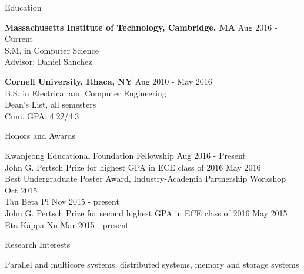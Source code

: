 \documentclass{resume} %
\begin{document}

\begin{rSection}{Education}

{\bf Massachusetts Institute of Technology, Cambridge, MA} \hfill { Aug 2016 - Current} \\ 
S.M. in Computer Science \\
Advisor: Daniel Sanchez

{\bf Cornell University, Ithaca, NY} \hfill { Aug 2010 - May 2016} \\ 
B.S. in Electrical and Computer Engineering \\
Dean's List, all semesters \\
Cum. GPA: 4.22/4.3 %

\end{rSection}


\begin{rSection}{Honors and Awards}

Kwanjeong Educational Foundation Fellowship \hfill {Aug 2016 - Present} \\
John G. Pertsch Prize for highest GPA in ECE class of 2016 \hfill{May 2016} \\
Best Undergraduate Poster Award, Industry-Academia Partnership Workshop \hfill { Oct 2015} \\
Tau Beta Pi \hfill { Nov 2015 - present} \\
John G. Pertsch Prize for second highest GPA in ECE class of 2016 \hfill { May 2015} \\
Eta Kappa Nu \hfill { Mar 2015 - present} 

\end{rSection}


\begin{rSection}{Research Interests}

Parallel and multicore systems, distributed systems, memory and storage systems

\end{rSection}
\end{document}
